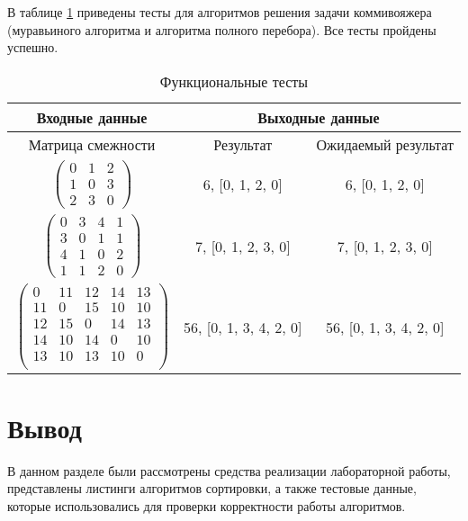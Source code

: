 В таблице \ref{tbl:functional_test} приведены тесты для алгоритмов решения задачи коммивояжера (муравьиного алгоритма и алгоритма полного перебора). Все тесты пройдены успешно.

\begin{table}[h]
	\begin{center}
        \captionsetup{justification=raggedright,singlelinecheck=off}
		\caption{\label{tbl:functional_test} Функциональные тесты}
		\begin{tabular}{|c|c|c|}
            \hline
        	Входные данные& \multicolumn{2}{c|}{Выходные данные}
        	\\ \hline
        	Матрица смежности & Результат & Ожидаемый результат 
        	\\ \hline
        	$\begin{pmatrix}
        		0 & 1 & 2\\
        		1 & 0 & 3\\
        		2 & 3 & 0
        	\end{pmatrix}$ & 6, [0, 1, 2, 0] & 6, [0, 1, 2, 0]
        	\\ \hline
        	$\begin{pmatrix}
        		0 & 3 & 4 & 1\\
        		3 & 0 & 1 & 1\\
        		4 & 1 & 0 & 2\\
        		1 & 1 & 2 & 0
        	\end{pmatrix}$ & 7, [0, 1, 2, 3, 0] & 7, [0, 1, 2, 3, 0]
        	\\ \hline
        	$\begin{pmatrix}
        		0 & 11 & 12 & 14 & 13\\
        		11 & 0 & 15 & 10 & 10\\
        		12 & 15 & 0 & 14 & 13\\
        		14 & 10 & 14 & 0 & 10\\
        		13 & 10 & 13 & 10 & 0\\
        	\end{pmatrix}$ & 56, [0, 1, 3, 4, 2, 0] & 56, [0, 1, 3, 4, 2, 0]
        	\\ \hline
		\end{tabular}
	\end{center}
\end{table}

\section*{Вывод}
В данном разделе были рассмотрены средства реализации лабораторной работы, представлены листинги алгоритмов сортировки, а также тестовые данные, которые использовались для проверки корректности работы алгоритмов.